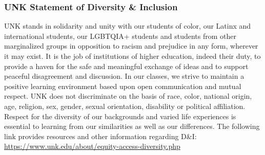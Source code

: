 \documentclass[12pt]{article}
\newcounter{on}\setcounter{on}{0}
\newcounter{ex}\setcounter{ex}{0}
\begin{document}
\subsubsection*{UNK Statement of Diversity \& Inclusion}

UNK stands in solidarity and unity with our students of color, our Latinx and international students, our LGBTQIA+ students 
and students from other marginalized groups in opposition to racism 
and prejudice in any form, wherever it may exist. It is the job of 
institutions of higher education, indeed their duty, to provide a 
haven for the safe and meaningful exchange of ideas and to support 
peaceful disagreement and discussion. In our classes, we strive to 
maintain a positive learning environment based upon open 
communication and mutual respect. UNK does not discriminate on the 
basis of race, color, national origin, age, religion, sex, gender, 
sexual orientation, disability or political affiliation. 
Respect for the diversity of our backgrounds and varied life 
experiences is essential to learning from our similarities as well 
as our differences. The following link provides resources and other 
information regarding D\&I: \url{https://www.unk.edu/about/equity-access-diversity.php}



\end{document}
